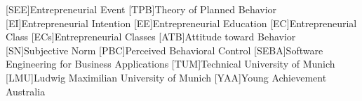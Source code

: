 \begin{acronym}
[SEE]{Entrepreneurial Event}
[TPB]{Theory of Planned Behavior}
[EI]{Entrepreneurial Intention}
[EE]{Entrepreneurial Education}
[EC]{Entrepreneurial Class}
[ECs]{Entrepreneurial Classes}
[ATB]{Attitude toward Behavior}
[SN]{Subjective Norm}
[PBC]{Perceived Behavioral Control}
[SEBA]{Software Engineering for Business Applications}
[TUM]{Technical University of Munich}
[LMU]{Ludwig Maximilian University of Munich}
[YAA]{Young Achievement Australia}
\end{acronym}
